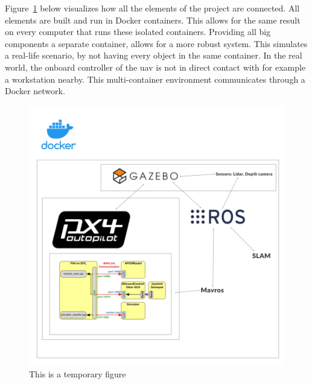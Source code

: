 Figure~\ref{fig:temp} below visualizes how all the elements of the project are connected. All elements are built and run in Docker containers. This allows for the same result on every computer that runs these isolated containers. Providing all big components a separate container, allows for a more robust system. This simulates a real\hyp{}life scenario, by not having every object in the same container. In the real world, the onboard controller of the \acs{uav} is not in direct contact with for example a workstation nearby. This multi\hyp{}container environment communicates through a Docker network.

\begin{figure}[!h]
  \centering
  \includegraphics[width=0.6\linewidth]{images/temp.png}
  \caption{This is a temporary figure}
  \label{fig:temp}
\end{figure}